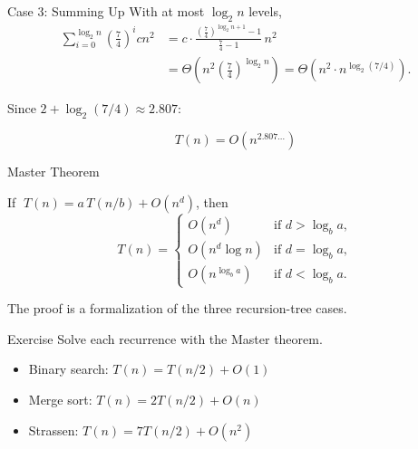 \documentclass[10pt,aspectratio=169]{beamer}
\begin{document}
\begin{frame}{Case 3: Summing Up}
  With at most $\log_2 n$ levels,
  \[
    \begin{aligned}
      \sum_{i=0}^{\log_2 n} \left(\tfrac{7}{4}\right)^i cn^2
      &= c \cdot \frac{\left(\frac74\right)^{\log_2 n + 1} - 1}{\frac74 - 1}\, n^2 \\[0.4em]
      &= \Theta\!\left(n^2 \left(\tfrac74\right)^{\log_2 n}\right)
       = \Theta\!\left(n^2 \cdot n^{\log_2 (7/4)}\right).
    \end{aligned}
  \]

  \bigskip
  Since $2 + \log_2(7/4) \approx 2.807$:
  \begin{alertblock}{}
    \[ T(n) = O\!\left(n^{2.807\ldots}\right) \]
  \end{alertblock}
\end{frame}

\begin{frame}{Master Theorem}
  \begin{block}{}
    If $\;T(n) = a\,T(n/b) + O(n^d)$, then
    \[
      T(n) = \begin{cases}
        O(n^d)          & \text{if } d > \log_b a, \\
        O(n^d \log n)   & \text{if } d = \log_b a, \\
        O(n^{\log_b a}) & \text{if } d < \log_b a.
      \end{cases}
    \]
  \end{block}

  \bigskip
  \begin{center}
    The proof is a formalization of the three recursion-tree cases.
  \end{center}
\end{frame}

\begin{frame}{Exercise}
  Solve each recurrence with the Master theorem.

  \bigskip
  \begin{itemize}
    \item Binary search: \quad $T(n) = T(n/2) + O(1)$
    \bigskip
    \item Merge sort: \quad $T(n) = 2T(n/2) + O(n)$
    \bigskip
    \item Strassen: \quad $T(n) = 7T(n/2) + O(n^2)$
  \end{itemize}
\end{frame}
\end{document}

